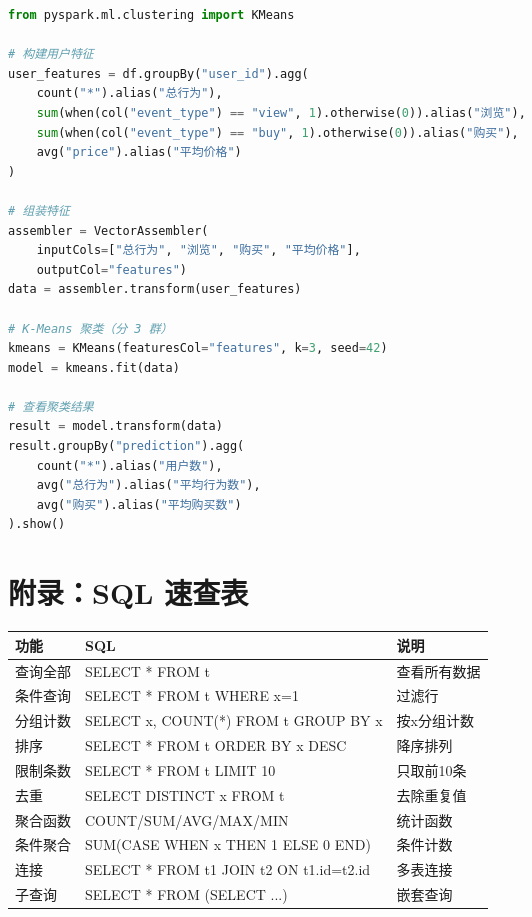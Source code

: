 \documentclass[12pt,a4paper]{article}
\begin{document}
\begin{lstlisting}[language=Python]
from pyspark.ml.clustering import KMeans

# 构建用户特征
user_features = df.groupBy("user_id").agg(
    count("*").alias("总行为"),
    sum(when(col("event_type") == "view", 1).otherwise(0)).alias("浏览"),
    sum(when(col("event_type") == "buy", 1).otherwise(0)).alias("购买"),
    avg("price").alias("平均价格")
)

# 组装特征
assembler = VectorAssembler(
    inputCols=["总行为", "浏览", "购买", "平均价格"],
    outputCol="features")
data = assembler.transform(user_features)

# K-Means 聚类（分 3 群）
kmeans = KMeans(featuresCol="features", k=3, seed=42)
model = kmeans.fit(data)

# 查看聚类结果
result = model.transform(data)
result.groupBy("prediction").agg(
    count("*").alias("用户数"),
    avg("总行为").alias("平均行为数"),
    avg("购买").alias("平均购买数")
).show()
\end{lstlisting}

\section{附录：SQL 速查表}

{\footnotesize
\begin{longtable}{lll}
\toprule
\textbf{功能} & \textbf{SQL} & \textbf{说明} \\
\midrule
查询全部 & SELECT * FROM t & 查看所有数据 \\
条件查询 & SELECT * FROM t WHERE x=1 & 过滤行 \\
分组计数 & SELECT x, COUNT(*) FROM t GROUP BY x & 按x分组计数 \\
排序 & SELECT * FROM t ORDER BY x DESC & 降序排列 \\
限制条数 & SELECT * FROM t LIMIT 10 & 只取前10条 \\
去重 & SELECT DISTINCT x FROM t & 去除重复值 \\
聚合函数 & COUNT/SUM/AVG/MAX/MIN & 统计函数 \\
条件聚合 & SUM(CASE WHEN x THEN 1 ELSE 0 END) & 条件计数 \\
连接 & SELECT * FROM t1 JOIN t2 ON t1.id=t2.id & 多表连接 \\
子查询 & SELECT * FROM (SELECT ...) & 嵌套查询 \\
\bottomrule
\end{longtable}
}
\end{document}
